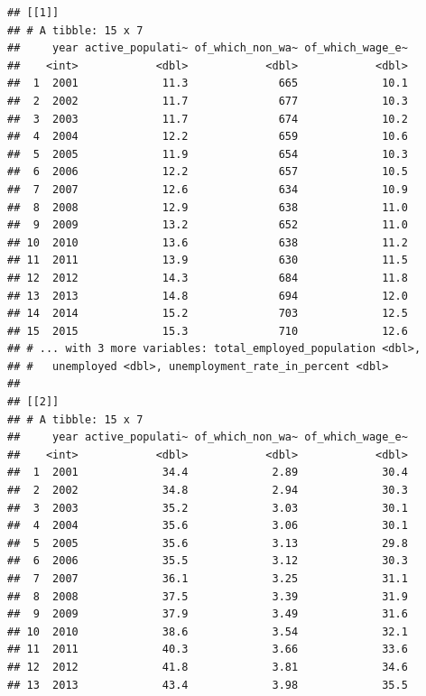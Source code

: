 \documentclass[]{gitbook}
\newenvironment{Shaded}{\begin{snugshade}}{\end{snugshade}}
\newcommand{\KeywordTok}[1]{\textcolor[rgb]{0.13,0.29,0.53}{\textbf{#1}}}
\newcommand{\NormalTok}[1]{#1}
\newcommand{\OperatorTok}[1]{\textcolor[rgb]{0.81,0.36,0.00}{\textbf{#1}}}
\newcommand{\StringTok}[1]{\textcolor[rgb]{0.31,0.60,0.02}{#1}}
\begin{document}
\begin{Shaded}
\end{Shaded}

\begin{verbatim}
## [[1]]
## # A tibble: 15 x 7
##     year active_populati~ of_which_non_wa~ of_which_wage_e~
##    <int>            <dbl>            <dbl>            <dbl>
##  1  2001             11.3              665             10.1
##  2  2002             11.7              677             10.3
##  3  2003             11.7              674             10.2
##  4  2004             12.2              659             10.6
##  5  2005             11.9              654             10.3
##  6  2006             12.2              657             10.5
##  7  2007             12.6              634             10.9
##  8  2008             12.9              638             11.0
##  9  2009             13.2              652             11.0
## 10  2010             13.6              638             11.2
## 11  2011             13.9              630             11.5
## 12  2012             14.3              684             11.8
## 13  2013             14.8              694             12.0
## 14  2014             15.2              703             12.5
## 15  2015             15.3              710             12.6
## # ... with 3 more variables: total_employed_population <dbl>,
## #   unemployed <dbl>, unemployment_rate_in_percent <dbl>
## 
## [[2]]
## # A tibble: 15 x 7
##     year active_populati~ of_which_non_wa~ of_which_wage_e~
##    <int>            <dbl>            <dbl>            <dbl>
##  1  2001             34.4             2.89             30.4
##  2  2002             34.8             2.94             30.3
##  3  2003             35.2             3.03             30.1
##  4  2004             35.6             3.06             30.1
##  5  2005             35.6             3.13             29.8
##  6  2006             35.5             3.12             30.3
##  7  2007             36.1             3.25             31.1
##  8  2008             37.5             3.39             31.9
##  9  2009             37.9             3.49             31.6
## 10  2010             38.6             3.54             32.1
## 11  2011             40.3             3.66             33.6
## 12  2012             41.8             3.81             34.6
## 13  2013             43.4             3.98             35.5

\end{verbatim}
\end{document}
